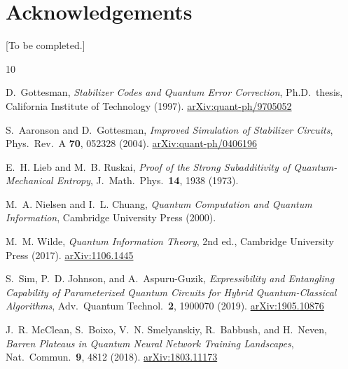 \documentclass[11pt,a4paper]{article}
\begin{document}
\section*{Acknowledgements}

[To be completed.]

\begin{thebibliography}{10}

D.~Gottesman,
\textit{Stabilizer Codes and Quantum Error Correction},
Ph.D.\ thesis, California Institute of Technology (1997).
\href{https://arxiv.org/abs/quant-ph/9705052}{arXiv:quant-ph/9705052}

S.~Aaronson and D.~Gottesman,
\textit{Improved Simulation of Stabilizer Circuits},
Phys.\ Rev.\ A \textbf{70}, 052328 (2004).
\href{https://arxiv.org/abs/quant-ph/0406196}{arXiv:quant-ph/0406196}

E.~H. Lieb and M.~B. Ruskai,
\textit{Proof of the Strong Subadditivity of Quantum-Mechanical Entropy},
J.\ Math.\ Phys.\ \textbf{14}, 1938 (1973).

M.~A. Nielsen and I.~L. Chuang,
\textit{Quantum Computation and Quantum Information},
Cambridge University Press (2000).

M.~M. Wilde,
\textit{Quantum Information Theory}, 2nd ed.,
Cambridge University Press (2017).
\href{https://arxiv.org/abs/1106.1445}{arXiv:1106.1445}

S.~Sim, P.~D. Johnson, and A.~Aspuru-Guzik,
\textit{Expressibility and Entangling Capability of Parameterized Quantum
Circuits for Hybrid Quantum-Classical Algorithms},
Adv.\ Quantum Technol.\ \textbf{2}, 1900070 (2019).
\href{https://arxiv.org/abs/1905.10876}{arXiv:1905.10876}

J.~R. McClean, S.~Boixo, V.~N. Smelyanskiy, R.~Babbush, and H.~Neven,
\textit{Barren Plateaus in Quantum Neural Network Training Landscapes},
Nat.\ Commun.\ \textbf{9}, 4812 (2018).
\href{https://arxiv.org/abs/1803.11173}{arXiv:1803.11173}

\end{thebibliography}
\end{document}
